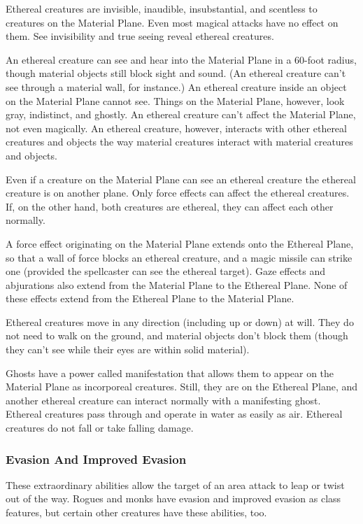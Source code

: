 Ethereal creatures are invisible, inaudible, insubstantial, and scentless to creatures on the Material Plane. Even most magical attacks have no effect on them. See invisibility and true seeing reveal ethereal creatures.

An ethereal creature can see and hear into the Material Plane in a 60-foot radius, though material objects still block sight and sound. (An ethereal creature can't see through a material wall, for instance.) An ethereal creature inside an object on the Material Plane cannot see. Things on the Material Plane, however, look gray, indistinct, and ghostly. An ethereal creature can't affect the Material Plane, not even magically. An ethereal creature, however, interacts with other ethereal creatures and objects the way material creatures interact with material creatures and objects.

Even if a creature on the Material Plane can see an ethereal creature the ethereal creature is on another plane. Only force effects can affect the ethereal creatures. If, on the other hand, both creatures are ethereal, they can affect each other normally.

A force effect originating on the Material Plane extends onto the Ethereal Plane, so that a wall of force blocks an ethereal creature, and a magic missile can strike one (provided the spellcaster can see the ethereal target). Gaze effects and abjurations also extend from the Material Plane to the Ethereal Plane. None of these effects extend from the Ethereal Plane to the Material Plane.

Ethereal creatures move in any direction (including up or down) at will. They do not need to walk on the ground, and material objects don't block them (though they can't see while their eyes are within solid material).

Ghosts have a power called manifestation that allows them to appear on the Material Plane as incorporeal creatures. Still, they are on the Ethereal Plane, and another ethereal creature can interact normally with a manifesting ghost. Ethereal creatures pass through and operate in water as easily as air. Ethereal creatures do not fall or take falling damage.

\subsubsection{Evasion And Improved Evasion}
These extraordinary abilities allow the target of an area attack to leap or twist out of the way. Rogues and monks have evasion and improved evasion as class features, but certain other creatures have these abilities, too.

